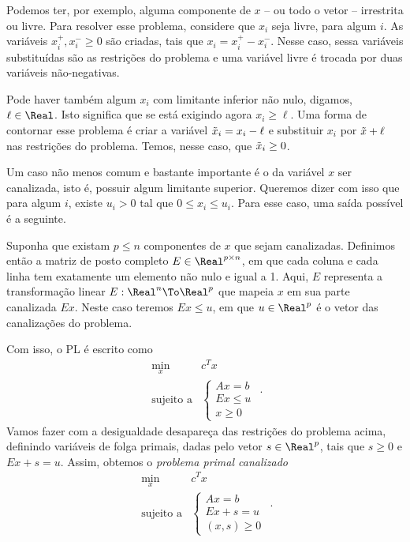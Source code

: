 Podemos ter, por exemplo, alguma componente de $x$ -- ou todo o vetor -- irrestrita ou livre. Para resolver esse problema, considere que $x_{i}$ seja livre, para algum $i$. As variáveis $x_{i}^{+},x_{i}^{-}\geq 0$ são criadas, tais que $x_{i} = x_{i}^{+} -  x_{i}^{-}$. Nesse caso, sessa variáveis substituídas são as restrições do problema e  uma variável livre é trocada por duas variáveis não-negativas. 

Pode haver também algum $x_{i}$ com limitante inferior não nulo, digamos, $\ell\in\Real$. Isto significa que se está exigindo agora $ x_{i}\geq \ell$. Uma forma de  contornar esse problema é  criar a variável $\tilde{x}_{i} = x_{i} - \ell$ e substituir $x_{i}$ por $\tilde{x} +\ell $ nas restrições do problema. Temos, nesse caso, que $\tilde{x}_{i} \geq 0$.


Um caso não menos comum e bastante importante é o da variável $x$ ser canalizada, isto é, possuir algum limitante superior. Queremos dizer com isso que para algum $i$, existe  $u_i>0$ tal que $0\leq x_{i} \leq u_{i}$. Para esse caso, uma saída possível é a seguinte. 

Suponha que existam $p\leq n$ componentes de $x$ que sejam canalizadas. Definimos então a matriz de posto completo $E\in\Real^{p\times n}$, em que cada coluna e cada linha tem exatamente um elemento não nulo e igual a 1. Aqui, $E$  representa a transformação linear $E:\Real^{n}\To \Real^{p}$ que mapeia $x$ em sua parte canalizada $Ex$. Neste caso teremos $Ex \leq u$, em que $u\in\Real^{p}$ é o vetor das canalizações do problema.


Com isso, o \ac{PL} é escrito como 
\begin{equation*}
	\begin{array}{lc}
\displaystyle \min_{x} & c^Tx \\
\text{sujeito a} &\begin{cases} Ax = b \\
								Ex \leq u	\\				 
				 x \geq 0	
				 \end{cases}
\end{array}.
\end{equation*}
Vamos fazer com a desigualdade desapareça das restrições do problema acima, definindo variáveis de folga primais, dadas pelo vetor $s\in\Real^{p}$, tais que $s\geq 0$ e $Ex +s =  u$. Assim, obtemos o \emph{problema primal canalizado}
\begin{equation}
\label{eq:introPL-primal-bounded}
	\begin{array}{lc}
\displaystyle \min_{x} & c^Tx \\
\text{sujeito a} &\begin{cases} Ax = b \\
								Ex +s =  u	\\				 
				 (x,s) \geq 0	
				 \end{cases}
\end{array}.
\end{equation}

